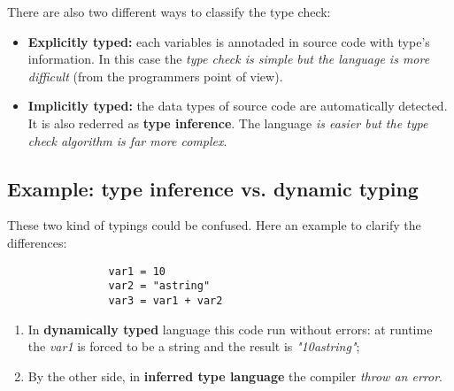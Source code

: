 \documentclass[12pt]{article}
\begin{document}
		There are also two different ways to classify the type check:
		
		\begin{itemize}
			\item \textbf{Explicitly typed:} each variables is annotaded in source code with type's information. In this case the \textit{type check is simple but the language is more difficult} (from the programmers point of view).
			\item \textbf{Implicitly typed:} the data types of source code are automatically detected. It is also rederred as \textbf{type inference}. The language \textit{is easier but the type check algorithm is far more complex}.
		\end{itemize}
	
		\subsection{Example: type inference vs. dynamic typing}
			These two kind of typings could be confused. Here an example to clarify the differences:

			\begin{lstlisting}
				var1 = 10
				var2 = "astring"
				var3 = var1 + var2
			\end{lstlisting}
			
			\begin{enumerate}
				\item In \textbf{dynamically typed} language this code run without errors: at runtime the \textit{var1} is forced to be a string and the result is \textit{"10astring"};
				\item By the other side, in \textbf{inferred type language} the compiler \textit{throw an error}.
			\end{enumerate}
		







		
\end{document}
